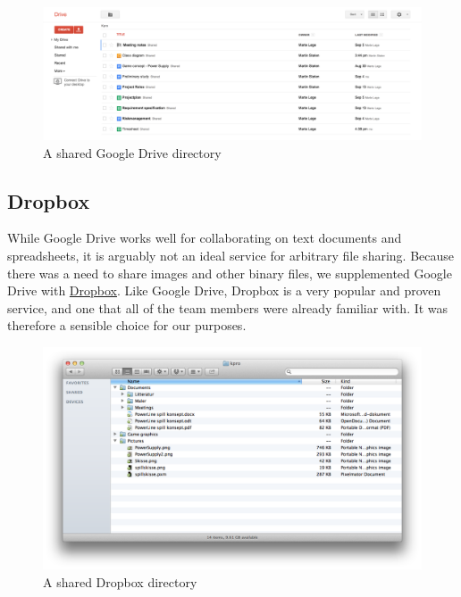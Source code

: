     \begin{figure}[htb]
      \centering
      \includegraphics[width=1\textwidth]{pictures/google_drive.png}
      \caption{A shared Google Drive directory}
    \end{figure}

\subsection{Dropbox}
    While Google Drive works well for collaborating on text documents and
    spreadsheets, it is arguably not an ideal service for arbitrary file
    sharing. Because there was a need to share images and other binary files, we
    supplemented Google Drive with \href{https://www.dropbox.com/}{Dropbox}. Like
    Google Drive, Dropbox is a very popular and proven service, and one that all of
    the team members were already familiar with. It was therefore a sensible choice
    for our purposes. \cite{dropbox}

    \begin{figure}[htb]
      \centering
      \includegraphics[width=1\textwidth]{pictures/dropbox.png}
      \caption{A shared Dropbox directory}
    \end{figure}
